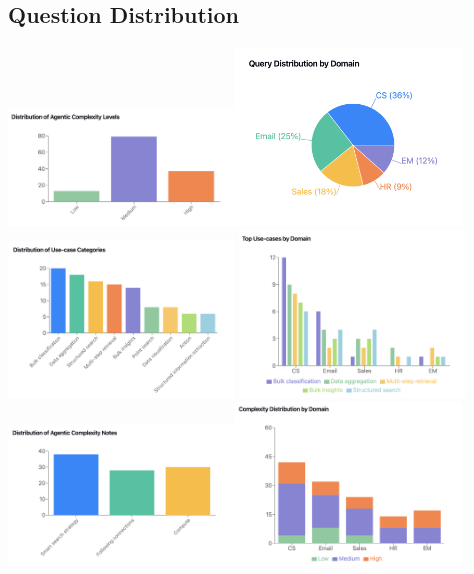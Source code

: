 \documentclass[11pt,a4paper]{article}
\begin{document}
\subsection{Question Distribution}

\includegraphics[width=6cm]{../agentic-complexity-levels.png}\includegraphics[width=6cm]{../query_distribution_by_domain.png} \includegraphics[width=6cm]{../use-case-category-distribution.png}
\includegraphics[width=6cm]{../use-cases-by-domain.png}\includegraphics[width=6cm]{../agentic-complexity-types.png}\includegraphics[width=6cm]{../complexity-levels-by-domain.png}
\end{document}
